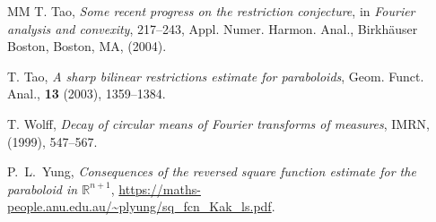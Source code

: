 \documentclass[11pt]{amsart}
\theoremstyle{definition}
\theoremstyle{remark}
\begin{document}
\begin{thebibliography}{MM}
 T. Tao, 
\textit{Some recent progress on the restriction conjecture}, in {\it Fourier analysis and convexity}, 217--243, Appl. Numer. Harmon. Anal., Birkh\"auser Boston, Boston, MA, (2004).

 T. Tao,
\textit{A sharp bilinear restrictions estimate for paraboloids}, 
Geom. Funct. Anal., \textbf{13} (2003), 1359--1384.

 T. Wolff,
\textit{Decay of circular means of Fourier transforms of measures}, 
IMRN, (1999), 547--567.

 P.~L.~Yung,
\textit{Consequences of the reversed square function estimate for the paraboloid in $\mathbb{R}^{n+1}$}, \url{https://maths-people.anu.edu.au/~plyung/sq_fcn_Kak_ls.pdf}.

\end{thebibliography}
\end{document}
